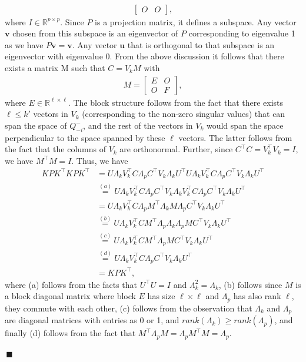\documentclass[12pt,journal,onecolumn]{IEEEtran}
\newenvironment{Proof}[1]{\medskip\par\noindent{\bf Proof:\,}\,#1}{{\mbox{\,$\blacksquare$}\par}}
\begin{document}
\begin{Proof}
\begin{align*}
\begin{bmatrix}
    O & O\end{bmatrix},
\end{align*}
where $I\in\mathbb{R}^{p\times p}$. Since $P$ is a projection matrix, it defines a subspace. Any vector $\boldsymbol{v}$ chosen from this subspace is an eigenvector of $P$ corresponding to eigenvalue 1 as we have $P\boldsymbol{v}= \boldsymbol{v}$. Any vector $\boldsymbol{u}$ that is orthogonal to that subspace is an eigenvector with eigenvalue 0. From the above discussion it follows that there exists a matrix M such that $C=V_kM$ with
\begin{align*}
    M=\begin{bmatrix}E & O\\
    O & F\end{bmatrix},
\end{align*}
where $E\in\mathbb{R}^{\ell\times\ell}$. The block structure follows from the fact that there exists $\ell \leq k'$ vectors in $V_k$ (corresponding to the non-zero singular values) that can span the space of $Q_{-i}^{-}$, and the rest of the vectors in $V_k$ would span the space perpendicular to the space spanned by these $\ell$ vectors. The latter follows from the fact that the columns of $V_k$ are orthonormal. Further, since $C^\top C=V_k^\top V_k=I$, we have $M^\top M=I$. Thus, we have
\begin{align}\label{eqn:projection}
    KPK^\top KP K^\top&=U\Lambda_k V_k^\top C\Lambda_p C^\top V_k\Lambda_kU^\top U\Lambda_k V_k^\top C\Lambda_p C^\top V_k\Lambda_kU^\top\nonumber\\
    &\overset{(a)}=U\Lambda_kV_k^\top C\Lambda_pC^\top V_k\Lambda_k V_k^\top C\Lambda_p C^\top V_k\Lambda_kU^\top\nonumber\\
    &=U\Lambda_kV_k^\top C\Lambda_p M^\top\Lambda_k M \Lambda_p C^\top V_k\Lambda_kU^\top\nonumber\\
    &\overset{(b)}=U\Lambda_kV_k^\top CM^\top\Lambda_p\Lambda_k \Lambda_p MC^\top V_k\Lambda_kU^\top\nonumber\\
    &\overset{(c)}= U\Lambda_kV_k^\top CM^\top\Lambda_pMC^\top V_k\Lambda_kU^\top\nonumber\\
    &\overset{(d)}=U\Lambda_k V^\top_k C\Lambda_p C^\top V_k\Lambda_k U^\top\nonumber\\
    &= KPK^\top,
\end{align}
where (a) follows from the facts that $U^\top U=I$ and $\Lambda_k^2=\Lambda_k$, (b) follows since $M$ is a block diagonal matrix where block $E$ has size $\ell\times \ell$ and $\Lambda_p$ has also rank $\ell$, they commute with each other, (c) follows from the observation that $\Lambda_k$ and $\Lambda_p$ are diagonal matrices with entries as 0 or 1, and $rank(\Lambda_k)\geq rank(\Lambda_p)$, and finally (d) follows from the fact that $M^\top\Lambda_pM=\Lambda_pM^\top M=\Lambda_p$.


\end{Proof}
\end{document}
